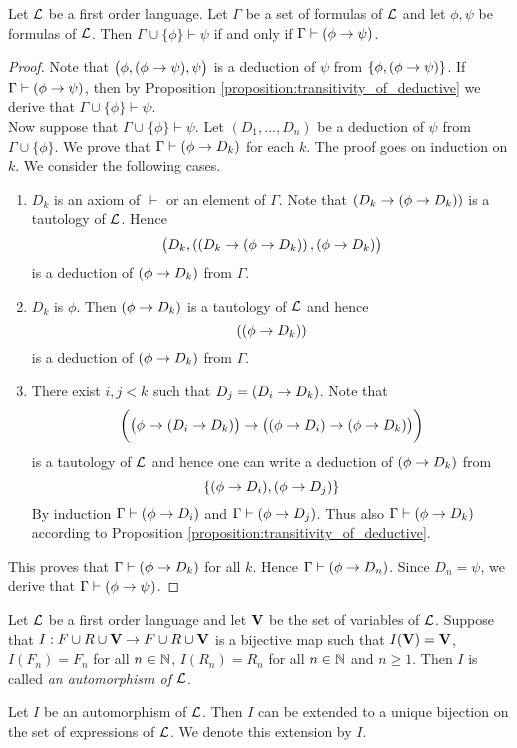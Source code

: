 \begin{theorem}[Deduction]\label{theorem:deduction_theorem}
Let ${\mathcal L}$ be a first order language. Let $\Gamma$ be a set of formulas of ${\mathcal L}$ and let $\phi, \psi$ be formulas of ${\mathcal L}$. Then $\Gamma \cup \{\phi\} \vdash \psi$ if and only if $\Gamma \vdash (\phi \rightarrow \psi)$.
\end{theorem}
\begin{proof}
Note that $\big(\phi, (\phi \rightarrow \psi) , \psi\big)$ is a deduction of $\psi$ from $\{\phi, (\phi \rightarrow \psi)\}$. If $\Gamma \vdash (\phi \rightarrow \psi)$, then by Proposition \ref{proposition:transitivity_of_deductive} we derive that $\Gamma \cup \{\phi\} \vdash \psi$.\\
Now suppose that $\Gamma \cup \{\phi\} \vdash \psi$. Let $(D_1 , ..., D_n)$ be a deduction of $\psi$ from $\Gamma \cup \{\phi\}$. We prove that $\Gamma \vdash (\phi \rightarrow D_k)$ for each $k$. The proof goes on induction on $k$. We consider the following cases.
\begin{enumerate}[label=\textbf{(\arabic*)}, leftmargin=3.0em]
\item $D_k$ is an axiom of $\vdash$ or an element of $\Gamma$. Note that $\left(D_k \rightarrow (\phi \rightarrow D_k )\right)$ is a tautology of ${\mathcal L}$. Hence
$$\big(D_k,\left((D_k \rightarrow (\phi \rightarrow D_k )\right),(\phi \rightarrow D_k )\big)$$
is a deduction of $(\phi \rightarrow D_k)$ from $\Gamma$.
\item $D_k$ is $\phi$. Then $(\phi \rightarrow D_k)$ is a tautology of ${\mathcal L}$ and hence
$$\left((\phi \rightarrow D_k )\right)$$
is a deduction of $(\phi \rightarrow D_k)$ from $\Gamma$.
\item There exist $i, j < k$ such that $D_j = (D_i \rightarrow D_k)$. Note that
$$\bigg(\big(\phi \rightarrow (D_i \rightarrow D_k)\big) \rightarrow \big((\phi \rightarrow D_i ) \rightarrow (\phi \rightarrow D_k)\big)\bigg)$$
is a tautology of ${\mathcal L}$ and hence one can write a deduction of $(\phi \rightarrow D_k)$ from
$$\{(\phi \rightarrow D_i),(\phi \rightarrow D_j)\}$$
By induction $\Gamma \vdash (\phi \rightarrow D_i)$ and $\Gamma \vdash (\phi \rightarrow D_j)$. Thus also $\Gamma \vdash (\phi \rightarrow D_k)$ according to Proposition \ref{proposition:transitivity_of_deductive}.
\end{enumerate}
This proves that $\Gamma \vdash (\phi \rightarrow D_k)$ for all $k$. Hence $\Gamma \vdash (\phi \rightarrow D_n)$. Since $D_n = \psi$, we derive that $\Gamma \vdash (\phi \rightarrow \psi)$.
\end{proof}

\begin{definition}
Let ${\mathcal L}$ be a first order language and let $\mathbf{V}$ be the set of variables of ${\mathcal L}$. Suppose that $I:F\cup R \cup \mathbf{V}\rightarrow F \cup R \cup \mathbf{V}$ is a bijective map such that $I(\mathbf{V}) = \mathbf{V}$, $I(F_n) = F_n$ for all $n \in {\mathbb N}$, $I(R_n) = R_n$ for all $n \in {\mathbb N}$ and $n \geq 1$. Then $I$ is called \textit{an automorphism of ${\mathcal L}$}.
\end{definition}
\noindent
Let $I$ be an automorphism of ${\mathcal L}$. Then $I$ can be extended to a unique bijection on the set of expressions of ${\mathcal L}$. We denote this extension by $I$.

